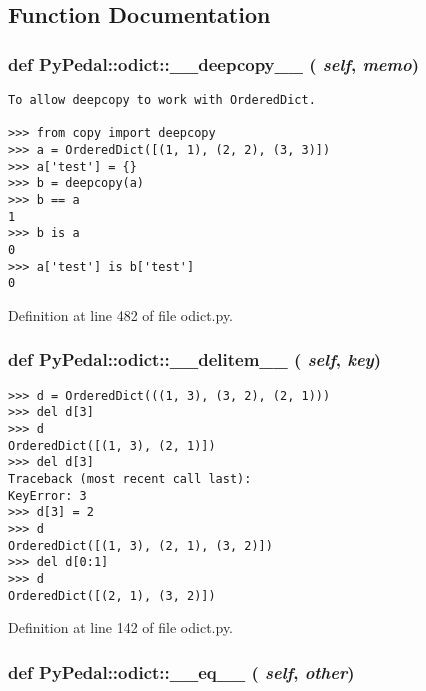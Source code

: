 \subsection{Function Documentation}
\hypertarget{namespacePyPedal_1_1odict_1cf35b25845fce82854cd61489fa9111}{
\subsubsection{\setlength{\rightskip}{0pt plus 5cm}def PyPedal::odict::\_\-\_\-deepcopy\_\-\_\- ( {\em self},  {\em memo})}}
\label{namespacePyPedal_1_1odict_1cf35b25845fce82854cd61489fa9111}




\footnotesize\begin{verbatim}
To allow deepcopy to work with OrderedDict.

>>> from copy import deepcopy
>>> a = OrderedDict([(1, 1), (2, 2), (3, 3)])
>>> a['test'] = {}
>>> b = deepcopy(a)
>>> b == a
1
>>> b is a
0
>>> a['test'] is b['test']
0
\end{verbatim}
\normalsize
 

Definition at line 482 of file odict.py.\hypertarget{namespacePyPedal_1_1odict_66328bfb7a954184d75037369e8d095b}{
\subsubsection{\setlength{\rightskip}{0pt plus 5cm}def PyPedal::odict::\_\-\_\-delitem\_\-\_\- ( {\em self},  {\em key})}}
\label{namespacePyPedal_1_1odict_66328bfb7a954184d75037369e8d095b}




\footnotesize\begin{verbatim}
>>> d = OrderedDict(((1, 3), (3, 2), (2, 1)))
>>> del d[3]
>>> d
OrderedDict([(1, 3), (2, 1)])
>>> del d[3]
Traceback (most recent call last):
KeyError: 3
>>> d[3] = 2
>>> d
OrderedDict([(1, 3), (2, 1), (3, 2)])
>>> del d[0:1]
>>> d
OrderedDict([(2, 1), (3, 2)])
\end{verbatim}
\normalsize
 

Definition at line 142 of file odict.py.\hypertarget{namespacePyPedal_1_1odict_6623f0dfd4da79422bcbdcd534133cf6}{
\subsubsection{\setlength{\rightskip}{0pt plus 5cm}def PyPedal::odict::\_\-\_\-eq\_\-\_\- ( {\em self},  {\em other})}}
\label{namespacePyPedal_1_1odict_6623f0dfd4da79422bcbdcd534133cf6}




